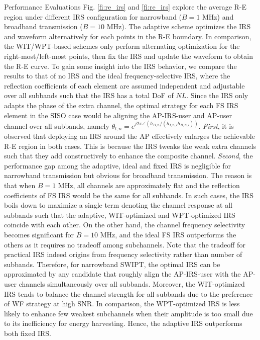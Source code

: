 \documentclass{IEEEtran}
\begin{document}
\begin{section}{Performance Evaluations}
	Fig. \ref{fi:re_irs} and \ref{fi:re_irs} explore the average R-E region under different IRS configuration for narrowband ($B=1$ \si{\MHz}) and broadband transmission ($B=10$ \si{\MHz}). The adaptive scheme optimizes the IRS and waveform alternatively for each points in the R-E boundary. In comparison, the WIT/WPT-based schemes only perform alternating optimization for the right-most/left-most points, then fix the IRS and update the waveform to obtain the R-E curve. To gain some insight into the IRS behavior, we compare the results to that of no IRS and the ideal frequency-selective IRS, where the reflection coefficients of each element are assumed independent and adjustable over all subbands such that the IRS has a total DoF of $NL$. Since the IRS only adapts the phase of the extra channel, the optimal strategy for each FS IRS element in the SISO case would be aligning the AP-IRS-user and AP-user channel over all subbands, namely $\theta_{l,n}=e^{j2\pi\angle{(h_{D,n}/(h_{I,n,l}h_{R,n,l}))}}$. \textit{First}, it is observed that deploying an IRS around the AP effectively enlarges the achievable R-E region in both cases. This is because the IRS tweaks the weak extra channels such that they add constructively to enhance the composite channel. \textit{Second}, the performance gap among the adaptive, ideal and fixed IRS is negligible for narrowband transmission but obvious for broadband transmission. The reason is that when $B=1$ \si{\MHz}, all channels are approximately flat and the reflection coefficients of FS IRS would be the same for all subbands. In such cases, the IRS boils down to maximize a single term denoting the channel response at all subbands such that the adaptive, WIT-optimized and WPT-optimized IRS coincide with each other. On the other hand, the channel frequency selectivity becomes significant for $B=10$ \si{\MHz}, and the ideal FS IRS outperforms the others as it requires no tradeoff among subchannels. Note that the tradeoff for practical IRS indeed origins from frequency selectivity rather than number of subbands. Therefore, for narrowband SWIPT, the optimal IRS can be approximated by any candidate that roughly align the AP-IRS-user with the AP-user channels simultaneously over all subbands. Moreover, the WIT-optimized IRS tends to balance the channel strength for all subbands due to the preference of WF strategy at high SNR. In comparison, the WPT-optimized IRS is less likely to enhance few weakest subchannels when their amplitude is too small due to its inefficiency for energy harvesting. Hence, the adaptive IRS outperforms both fixed IRS.
\end{section}



\end{document}
